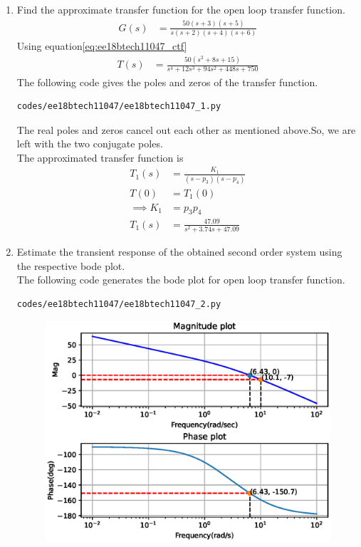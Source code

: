 \begin{enumerate}[label=\thesubsection.\arabic*.,ref=\thesubsection.\theenumi]
\item Find the approximate transfer function for the open loop transfer function.
\begin{align}
G(s) &= \frac{50(s+3)(s+5)}{s(s+2)(s+4)(s+6)}
\end{align}
\solution Using equation\eqref{eq:ee18btech11047_ctf}
\begin{align}
T(s) &= \frac{50(s^{2}+8s+15)}{s^4+12s^3+94s^2+448s+750}
\end{align}
The following code gives the poles and zeros of the transfer function.
\begin{lstlisting}
codes/ee18btech11047/ee18btech11047_1.py
\end{lstlisting}
\begin{table}[!ht]
\centering

\caption{}
\label{table:ee18btech11047}
\end{table}
The real poles  and zeros  cancel out each other as mentioned above.So, we are left with the two conjugate poles.\\
The approximated transfer function is 
\begin{align}
T_{1}(s) &= \frac{K_{1}}{(s-p_{3})(s-p_{4})}\\ 
T(0) &= T_{1}(0)\\
\implies K_{1} &= p_{3}p_{4}\\
T_{1}(s) &= \frac{47.09}{s^{2}+3.74s+47.09}
\end{align}
\item Estimate the transient response of the obtained second order system using the respective bode plot.\\
\solution The following code generates the bode plot for open loop transfer function.
\begin{lstlisting}
codes/ee18btech11047/ee18btech11047_2.py
\end{lstlisting}
\begin{figure}[!ht]
\centering
\includegraphics[width=\columnwidth]{./figs/ee18btech11047/ee18btech11047_2.eps}

\end{figure}
\end{enumerate}
